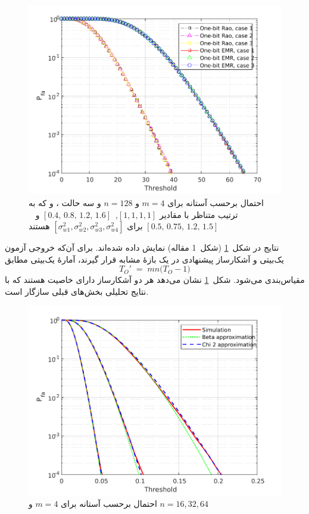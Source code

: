 \begin{figure}[!b]
	\centering
	\includegraphics[width=0.8\linewidth]{figs/cfar}
	\caption[احتمال  بر حسب آستانه]{
	احتمال  برحسب آستانه برای 
	$m=4$
	و
	$n=128$
	و سه حالت ،  و  که به ترتیب متناظر با مقادیر
	$
	[1,1,1,1]$,~$[0.4,\,0.8,\,1.2,\,1.6]$
	و ~$[0.5,\,0.75,\,1.2,\,1.5]$
	برای
	$[\sigma_{w1}^{2},\sigma_{w2}^{2},\sigma_{w3}^{2},\sigma_{w4}^{2}]$
	هستند
	}
	\label{fig:CFAR}
\end{figure} 

نتایج در شکل~\ref{fig:CFAR} (شکل~1 مقاله) نمایش داده شده‌اند.
برای آن‌که خروجی آزمون  یک‌بیتی و آشکارساز پیشنهادی در یک بازهٔ مشابه قرار گیرند، 
آمارۀ  یک‌بیتی مطابق
\[
T_{O}' \;=\; m n \big(T_{O}-1\big)
\]
مقیاس‌بندی می‌شود. 
شکل~\ref{fig:CFAR} نشان می‌دهد هر دو آشکارساز دارای خاصیت  هستند که با نتایج تحلیلی بخش‌های قبلی سازگار است.

\begin{figure}[!t]
	\centering
	\includegraphics[width=0.8\linewidth]{figs/false_alarm}
	\caption[احتمال  بر حسب آستانه برای $n$ های مختلف]{
		احتمال  برحسب آستانه برای 
		$m=4$
		و
		$n=16,32,64$
	}
	\label{fig:false_alarm}
\end{figure} 




